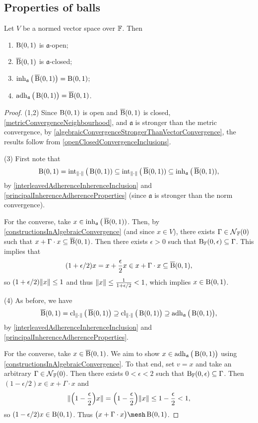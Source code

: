 \subsection{Properties of balls}
\begin{lemma} \label{ballAdherenceInherence}
Let $V$ be a normed vector space over $\mathbb{F}$. Then
\begin{enumerate}
\item $\operatorname{B}(0,1)$ is $\mathfrak{a}$-open;
\item $\operatorname{\overline{B}}(0,1)$ is $\mathfrak{a}$-closed;
\item $\operatorname{inh}_\mathfrak{a}\big(\operatorname{\overline{B}}(0,1)\big) = \operatorname{B}(0,1)$;
\item $\operatorname{adh}_\mathfrak{a}\big(\operatorname{B}(0,1)\big) = \operatorname{\overline{B}}(0,1)$.
\end{enumerate}
\end{lemma}
\begin{proof}
(1,2) Since $\operatorname{B}(0,1)$ is open and $\operatorname{\overline{B}}(0,1)$ is closed, \ref{metricConvergenceNeighbourhood}, and $\mathfrak{a}$ is stronger than the metric convergence, by \ref{algebraicConvergenceStrongerThanVectorConvergence}, the results follow from \ref{openClosedConvergenceInclusions}.

(3) First note that
\[ \operatorname{B}(0,1) = \operatorname{int}_{\lVert\cdot\rVert}\big(\operatorname{B}(0,1)) \subseteq \operatorname{int}_{\lVert\cdot\rVert}\big(\operatorname{\overline{B}}(0,1)) \subseteq \operatorname{inh}_{\mathfrak{a}}\big(\operatorname{\overline{B}}(0,1)), \]
by \ref{interleavedAdherenceInherenceInclusion} and \ref{principalInherenceAdherenceProperties} (since $\mathfrak{a}$ is stronger than the norm convergence).

For the converse, take $x\in \operatorname{inh}_{\mathfrak{a}}\big(\operatorname{\overline{B}}(0,1))$. Then, by \ref{constructionsInAlgebraicConvergence} (and since $x\in V$), there exists $\Gamma\in \operatorname{\mathcal{N}}_{\mathbb{F}}(0)$ such that $x+ \Gamma\cdot x \subseteq \operatorname{\overline{B}}(0,1)$. Then there exists $\epsilon >0$ such that $\operatorname{B}_{\mathbb{F}}(0,\epsilon) \subseteq \Gamma$. This implies that
\[ (1+ \epsilon/2)x = x + \frac{\epsilon}{2} x \in x+ \Gamma\cdot x \subseteq \operatorname{\overline{B}}(0,1), \]
so $(1+\epsilon/2)\lVert x\rVert \leq 1$ and thus $\lVert x\rVert \leq \frac{1}{1+\epsilon / 2} < 1$, which implies $x\in \operatorname{B}(0,1)$.

(4) As before, we have
\[ \operatorname{\overline{B}}(0,1) = \operatorname{cl}_{\lVert\cdot\rVert}\big(\operatorname{\overline{B}}(0,1)\big) \supseteq \operatorname{cl}_{\lVert\cdot\rVert}\big(\operatorname{B}(0,1)\big) \supseteq \operatorname{adh}_{\mathfrak{a}}\big(\operatorname{B}(0,1)\big), \]
by \ref{interleavedAdherenceInherenceInclusion} and \ref{principalInherenceAdherenceProperties}.

For the converse, take $x\in \operatorname{\overline{B}}(0,1)$. We aim to show $x\in \operatorname{adh}_\mathfrak{a}\big(\operatorname{B}(0,1)\big)$ using \ref{constructionsInAlgebraicConvergence}. To that end, set $v = x$ and take an arbitrary $\Gamma\in \operatorname{\mathcal{N}}_{\mathbb{F}}(0)$. Then there exists $0<\epsilon <2$ such that $\operatorname{B}_{\mathbb{F}}(0,\epsilon) \subseteq \Gamma$. Then $(1-\epsilon /2)x \in x + \Gamma\cdot x$ and
\[ \lVert\Big(1-\frac{\epsilon}{2}\Big)x\rVert = \Big(1-\frac{\epsilon}{2}\Big)\lVert x\rVert \leq 1-\frac{\epsilon}{2} < 1, \]
so $(1-\epsilon /2)x\in \operatorname{B}(0,1)$. Thus $\big(x + \Gamma\cdot x\big)\mesh \ball(0,1)$.
\end{proof}

